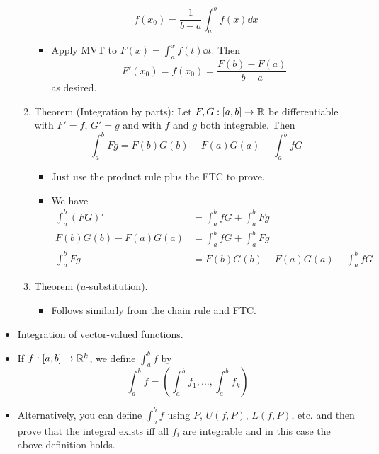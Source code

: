 \documentclass[../notes.tex]{subfiles}
\begin{document}
\begin{itemize}
\begin{enumerate}
        \begin{equation*}
            f(x_0) = \frac{1}{b-a}\int_a^bf(x)\dd{x}
        \end{equation*}
        \begin{itemize}
            \item Apply MVT to $F(x)=\int_a^xf(t)\dd{t}$. Then
            \begin{equation*}
                F'(x_0) = f(x_0) = \frac{F(b)-F(a)}{b-a}
            \end{equation*}
            as desired.
        \end{itemize}
        \item Theorem (Integration by parts): Let $F,G:[a,b]\to\mathbb{R}$ be differentiable with $F'=f$, $G'=g$ and with $f$ and $g$ both integrable. Then
        \begin{equation*}
            \int_a^bFg = F(b)G(b)-F(a)G(a)-\int_a^bfG
        \end{equation*}
        \begin{itemize}
            \item Just use the product rule plus the FTC to prove.
            \item We have
            \begin{align*}
                \int_a^b(FG)' &= \int_a^bfG+\int_a^bFg\\
                F(b)G(b)-F(a)G(a) &= \int_a^bfG+\int_a^bFg\\
                \int_a^bFg &= F(b)G(b)-F(a)G(a)-\int_a^bfG
            \end{align*}
        \end{itemize}
        \item Theorem ($u$-substitution).
        \begin{itemize}
            \item Follows similarly from the chain rule and FTC.
        \end{itemize}
    \end{enumerate}
    \item Integration of vector-valued functions.
    \item If $f:[a,b]\to\mathbb{R}^k$, we define $\int_a^bf$ by
    \begin{equation*}
        \int_a^bf = \left( \int_a^bf_1,\dots,\int_a^bf_k \right)
    \end{equation*}
    \item Alternatively, you can define $\int_a^bf$ using $P$, $U(f,P)$, $L(f,P)$, etc. and then prove that the integral exists iff all $f_i$ are integrable and in this case the above definition holds.

\end{itemize}
\end{document}
